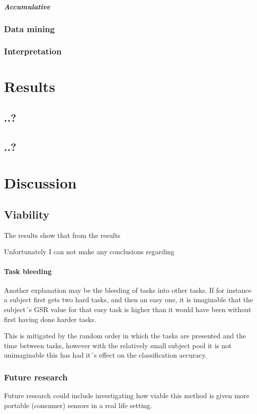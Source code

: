 \documentclass[12pt,leqno,letterpaper]{report} %
\begin{document}
\paragraph{Accumulative}




\subsection{Data mining}
\subsection{Interpretation}

\chapter{Results}

\section{..?}
\section{..?}

\chapter{Discussion}
\section{Viability}
The results show that from the results 

Unfortunately I can not make any conclusions regarding 

\subsubsection{Task bleeding}
Another explanation may be the bleeding of tasks into other tasks. If for instance a subject first gets two hard tasks, and then an easy one, it is imaginable that the subject´s GSR value for that easy task is higher than it would have been without first having done harder tasks. 

This is mitigated by the random order in which the tasks are presented and the time between tasks, however with the relatively small subject pool it is not unimaginable this has had it´s effect on the classification accuracy.




\subsection{Future research}
Future research could include investigating how viable this method is given more portable (consumer) sensors in a real life setting. 





{}
%
\end{document}
